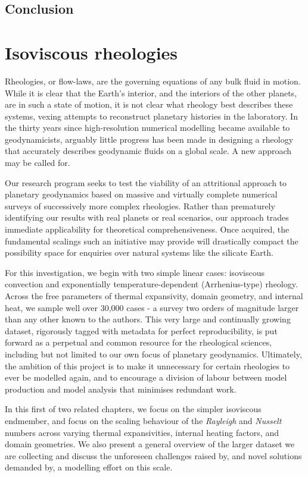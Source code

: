 \documentclass[a4paper,11pt,oneside]{book}
\begin{document}
\subsection{Conclusion}

\section{Isoviscous rheologies}

Rheologies, or flow-laws, are the governing equations of any bulk fluid in motion. While it is clear that the Earth's interior, and the interiors of the other planets, are in such a state of motion, it is not clear what rheology best describes these systems, vexing attempts to reconstruct planetary histories in the laboratory. In the thirty years since high-resolution numerical modelling became available to geodynamicists, arguably little progress has been made in designing a rheology that accurately describes geodynamic fluids on a global scale. A new approach may be called for.

Our research program seeks to test the viability of an attritional approach to planetary geodynamics based on massive and virtually complete numerical surveys of successively more complex rheologies. Rather than prematurely identifying our results with real planets or real scenarios, our approach trades immediate applicability for theoretical comprehensiveness. Once acquired, the fundamental scalings such an initiative may provide will drastically compact the possibility space for enquiries over natural systems like the silicate Earth.

For this investigation, we begin with two simple linear cases: isoviscous convection and exponentially temperature-dependent (Arrhenius-type) rheology. Across the free parameters of thermal expansivity, domain geometry, and internal heat, we sample well over 30,000 cases - a survey two orders of magnitude larger than any other known to the authors. This very large and continually growing dataset, rigorously tagged with metadata for perfect reproducibility, is put forward as a perpetual and common resource for the rheological sciences, including but not limited to our own focus of planetary geodynamics. Ultimately, the ambition of this project is to make it unnecessary for certain rheologies to ever be modelled again, and to encourage a division of labour between model production and model analysis that minimises redundant work.

In this first of two related chapters, we focus on the simpler isoviscous endmember, and focus on the scaling behaviour of the \textit{Rayleigh} and \textit{Nusselt} numbers across varying thermal expansivities, internal heating factors, and domain geometries. We also present a general overview of the larger dataset we are collecting and discuss the unforeseen challenges raised by, and novel solutions demanded by, a modelling effort on this scale.
\end{document}
